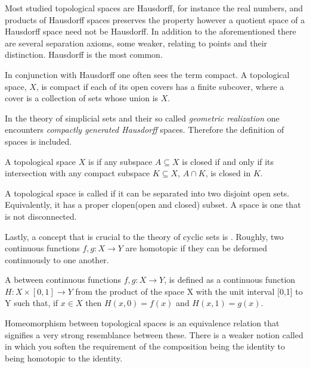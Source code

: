 \documentclass[../../main.tex]{subfiles}
\begin{document}
    Most studied topological spaces are Hausdorff, for instance the real numbers, and products of Hausdorff spaces preserves the property however a quotient space of a Hausdorff space need not be Hausdorff. In addition to the aforementioned there are several separation axioms, some weaker, relating to points and their distinction. Hausdorff is the most common.
    
    In conjunction with Hausdorff one often sees the term compact. A topological space, $X$, is compact if each of its open covers has a finite subcover, where a cover is a collection of sets whose union is $X$.

    In the theory of simplicial sets and their so called \textit{geometric realization} one encounters \textit{compactly generated Hausdorff} spaces. Therefore the definition of  spaces is included.

    \begin{definition}
        A topological space $X$ is  if any subspace $A \subseteq X$ is closed if and only if its intersection with any compact subspace $K \subseteq X$, $A \cap K$, is closed in $K$.
    \end{definition}

    A topological space is called  if it can be separated into two disjoint open sets. Equivalently, it has a proper clopen(open and closed) subset. A  space is one that is not disconnected.

    Lastly, a concept that is crucial to the theory of cyclic sets is . Roughly, two continuous functions $f, g: X \to Y$ are homotopic if they can be deformed continuously to one another.

    \begin{definition}
        A  between continuous functions $f,g: X\to Y$, is defined as a continuous function  $H : X \times [0,1] \to Y$ from the product of the space X with the unit interval [0,1] to Y such that, if $x \in X$ then $H(x,0) = f(x)$ and $H(x,1) = g(x)$.
    \end{definition}

    Homeomorphism between topological spaces is an equivalence relation that signifies a very strong resemblance between these. There is a weaker notion called  in which you soften the requirement of the composition being the identity to being homotopic to the identity.
\end{document}
